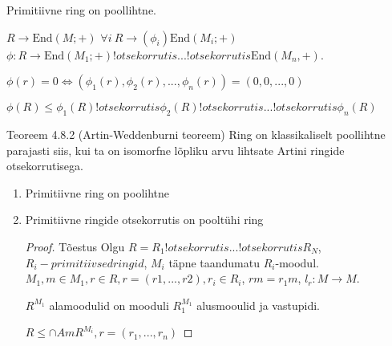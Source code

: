 \documentclass[12pt]{report}
\numberwithin{equation}{section}
\theoremstyle{definition}
\theoremstyle{plain}
\begin{document}
Primitiivne ring on poollihtne.

$R \to \text{End}(M;+)$
$\forall i ~ R \to (\phi_i) \text{End}(M_i;+)$
$\phi: R \to \text{End}(M_1;+) !otsekorrutis ... !otsekorrutis \text{End}(M_n,+)$.

$\phi(r) = 0  \iff (\phi_1(r),\phi_2(r),...,\phi_n(r))= (0,0,...,0)$

$\phi(R) \leq \phi_1(R) !otsekorrutis \phi_2(R) !otsekorrutis ... !otsekorrutis  \phi_n(R)$

Teoreem 4.8.2 (Artin-Weddenburni teoreem) Ring on klassikaliselt poollihtne parajasti siis, kui ta on isomorfne lõpliku arvu lihtsate Artini ringide otsekorrutisega.

\begin{enumerate}
\item Primitiivne ring on poolihtne
\item Primitiivne ringide otsekorrutis on poolt\"uhi ring
\begin{proof}
Tõestus
Olgu $R = R_1 !otsekorrutis ... !otsekorrutis R_N$, $R_i - primitiivsed ringid$, $M_i$ täpne taandumatu $R_i$-moodul.
$M_1, m \in M_1, r \in R, r = (r1,...,r2), r_i \in R_i$, $rm = r_1m$, $l_r : M \to M$.

$R^{M_1}$ alamoodulid on mooduli $R_{1}^{M_1}$ alusmooulid ja vastupidi.

$R \leq \cap Am R^{M_i}, r = (r_1,...,r_n)$


\end{proof}
\end{enumerate}
\end{document}
